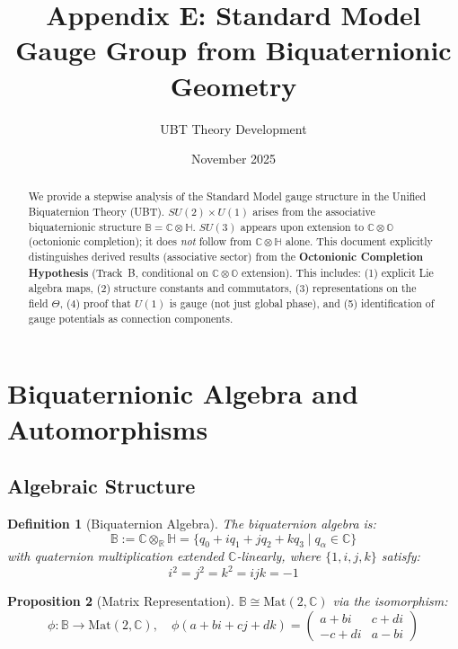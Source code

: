 \documentclass[12pt]{article}
\title{Appendix E: Standard Model Gauge Group from Biquaternionic Geometry}
\author{UBT Theory Development}
\date{November 2025}
\newtheorem{definition}{Definition}[section]
\newtheorem{proposition}[definition]{Proposition}
\newcommand{\B}{\mathbb{B}}
\newcommand{\C}{\mathbb{C}}
\newcommand{\R}{\mathbb{R}}
\renewcommand{\H}{\mathbb{H}}
\renewcommand{\O}{\mathbb{O}}
\begin{document}
\maketitle

\begin{abstract}
We provide a stepwise analysis of the Standard Model gauge structure in the Unified Biquaternion Theory (UBT). $SU(2) \times U(1)$ arises from the associative biquaternionic structure $\B = \C \otimes \H$. $SU(3)$ appears upon extension to $\C \otimes \O$ (octonionic completion); it does \emph{not} follow from $\C \otimes \H$ alone. This document explicitly distinguishes derived results (associative sector) from the \textbf{Octonionic Completion Hypothesis} (Track~B, conditional on $\C \otimes \O$ extension). This includes: (1) explicit Lie algebra maps, (2) structure constants and commutators, (3) representations on the field $\Theta$, (4) proof that $U(1)$ is gauge (not just global phase), and (5) identification of gauge potentials as connection components.
\end{abstract}

\tableofcontents

\section{Biquaternionic Algebra and Automorphisms}

\subsection{Algebraic Structure}

\begin{definition}[Biquaternion Algebra]
The biquaternion algebra is:
\begin{equation}
\B := \C \otimes_\R \H = \{q_0 + iq_1 + jq_2 + kq_3 \mid q_\alpha \in \C\}
\end{equation}
with quaternion multiplication extended $\C$-linearly, where $\{1,i,j,k\}$ satisfy:
\begin{equation}
i^2 = j^2 = k^2 = ijk = -1
\end{equation}
\end{definition}

\begin{proposition}[Matrix Representation]
$\B \cong \mathrm{Mat}(2,\C)$ via the isomorphism:
\begin{equation}
\phi: \B \to \mathrm{Mat}(2,\C), \quad \phi(a+bi+cj+dk) = \begin{pmatrix} a+bi & c+di \\ -c+di & a-bi \end{pmatrix}
\end{equation}
\end{proposition}
\end{document}

